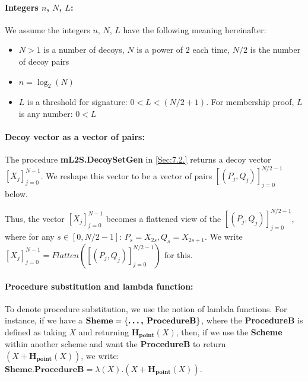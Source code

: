 \documentclass{mathcryptology} %
\newcommand{\Hpoint}{\textbf{H}_{\textbf{point}}}
\newcommand{\Flatten}{\textit{Flatten}}
\theoremstyle{title}
\theoremstyle{titleof}
\begin{document}
\paragraph*{Integers $n$, $N$, $L$:}
    We assume the integers $n$, $N$, $L$ have the following meaning hereinafter:
    \begin{itemize}
        \item $N>1$ is a number of decoys, $N$ is a power of $2$ each time, $N/2$ is the number of decoy pairs
        \item $n=\log_{2}\left(N\right)$
        \item $L$ is a threshold for signature: $0<L<\left(N/2+1\right)$. For membership proof, $L$ is any number: $0<L$
    \end{itemize}

\paragraph*{Decoy vector as a vector of pairs:}
    The procedure \textbf{mL2S.DecoySetGen} in \ref{Sec:7.2.} returns a decoy vector ${\left[X_{j}\right]}_{j=0}^{N-1}$. We reshape this vector to be a vector of pairs ${\left[\left(P_{j}, Q_{j}\right)\right]}_{j=0}^{N/2-1}$ below.

    Thus, the vector ${\left[X_{j}\right]}_{j=0}^{N-1}$ becomes a flattened view of the ${\left[\left(P_{j}, Q_{j}\right)\right]}_{j=0}^{N/2-1}$, where for any $s\in\left[0,N/2-1\right]$: $P_{s} =X_{2s},Q_{s}=X_{2s+1}$. We write ${\left[X_{j}\right]}_{j=0}^{N-1} = \Flatten \left({\left[\left(P_{j},Q_{j}\right)\right]}_{j=0}^{N/2-1}\right)$ for this.

\paragraph*{Procedure substitution and lambda function:}
    To denote procedure substitution, we use the notion of lambda functions. For instance, if we have a $\textbf{Sheme}= \left\{\textbf{\dots, ProcedureB}\right\}$, where the \textbf{ProcedureB} is defined as taking $X$ and returning $\Hpoint\left(X\right)$, then, if we use the \textbf{Scheme} within another scheme and want the \textbf{ProcedureB} to return $\left(X+\Hpoint\left(X\right)\right)$, we write: $\textbf{Sheme.ProcedureB}=\lambda \left(X\right).\left(X+\Hpoint\left(X\right)\right)$.


\end{document}
